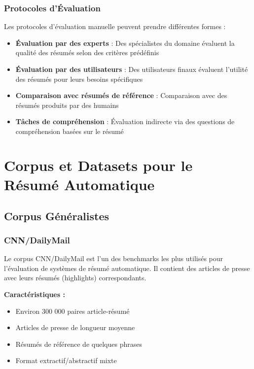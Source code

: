 \subsubsection{Protocoles d'Évaluation}

Les protocoles d'évaluation manuelle peuvent prendre différentes formes :

\begin{itemize}
    \item \textbf{Évaluation par des experts} : Des spécialistes du domaine évaluent la qualité des résumés selon des critères prédéfinis
    
    \item \textbf{Évaluation par des utilisateurs} : Des utilisateurs finaux évaluent l'utilité des résumés pour leurs besoins spécifiques
    
    \item \textbf{Comparaison avec résumés de référence} : Comparaison avec des résumés produits par des humains
    
    \item \textbf{Tâches de compréhension} : Évaluation indirecte via des questions de compréhension basées sur le résumé
\end{itemize}

\section{Corpus et Datasets pour le Résumé Automatique}

\subsection{Corpus Généralistes}

\subsubsection{CNN/DailyMail}

Le corpus CNN/DailyMail est l'un des benchmarks les plus utilisés pour l'évaluation de systèmes de résumé automatique. Il contient des articles de presse avec leurs résumés (highlights) correspondants.

\textbf{Caractéristiques :}
\begin{itemize}
    \item Environ 300 000 paires article-résumé
    \item Articles de presse de longueur moyenne
    \item Résumés de référence de quelques phrases
    \item Format extractif/abstractif mixte
\end{itemize}

